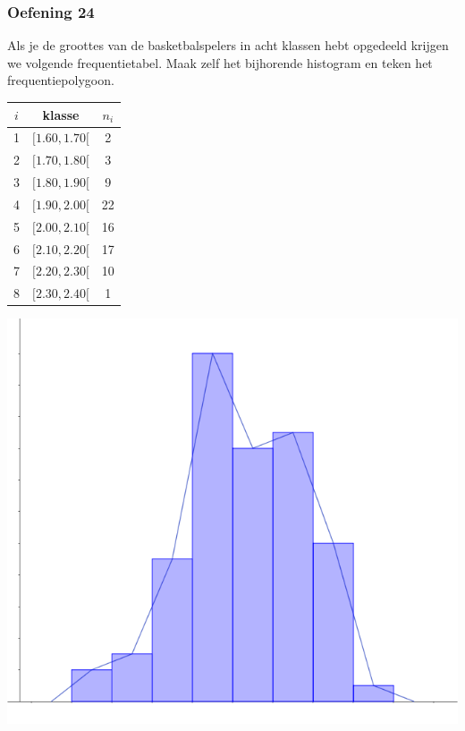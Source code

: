 \documentclass[13pt]{beamer}
\newenvironment{answer}
{\color{blue}}
{\color{black}}
\begin{document}
\begin{frame}
  \frametitle{Oefening 24}
  \begin{minipage}{0.5\linewidth}
  Als je de groottes van de basketbalspelers in acht klassen hebt opgedeeld krijgen we volgende frequentietabel. Maak zelf het bijhorende histogram en teken het frequentiepolygoon.\\
\end{minipage}
\begin{minipage}{0.4\linewidth}
  \begin{center}
    \begin{tabular}{c|c|c}
      $i$ & klasse     & $n_i$\\
      \hline
      1 & $[ 1.60,  1.70[$ &   2\\
      2 & $[ 1.70,  1.80[$ &   3\\
      3 & $[ 1.80,  1.90[$ &   9\\
      4 & $[ 1.90,  2.00[$ &   22\\
      5 & $[ 2.00,  2.10[$ &   16\\
      6 & $[ 2.10,  2.20[$ &   17\\
      7 & $[ 2.20,  2.30[$ &   10\\
      8 & $[ 2.30,  2.40[$ &   1\\
    \end{tabular}
  \end{center}
\end{minipage}
\vspace*{-1cm}
\begin{center}
  \begin{answer}
    \includegraphics[width=0.5\linewidth]{GrootteBasketbalSpelersHistogram}
  \end{answer}
\end{center}
\end{frame}
\end{document}
